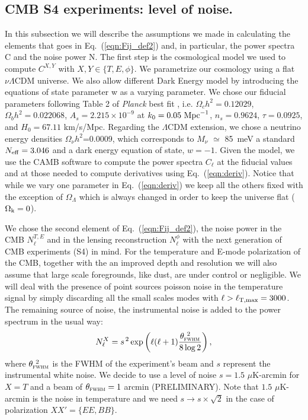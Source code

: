 \documentclass[aps,prd,preprint,groupedaddress]{revtex4-1}
\newcommand\refeq[1]{Eq.~(\ref{eqn:#1})}
\begin{document}
\subsection{CMB S4 experiments: level of noise.\label{subsec:cosmo-noise}}
In this subsection we will describe the assumptions we made in calculating the elements that goes in \refeq{Fij_def2} and, in particular, the power spectra C and the noise power N.
The first step is the cosmological model we used to compute $C^{X,Y}$ with $X,Y \in \{T,E,\phi\}$.
We parametrize our cosmology using a flat $\nu \Lambda$CDM universe. We also allow different Dark Energy model by introducing the equations of state parameter w as a varying parameter.
We chose our fiducial parameters following Table 2 of \textit{Planck} best fit \cite{planck-collaboration:2014g}, i.e. $\Omega_c h^2 = 0.12029$, $\Omega_b h^2 = 0.022068$, $A_s = 2.215\times10^{-9}$ at $k_0 = 0.05\ {\rm Mpc}^{-1}$, $n_s = 0.9624$, $\tau = 0.0925$, and $H_0 = 67.11$ km/s/Mpc. Regarding the $\Lambda$CDM extension, we chose a neutrino energy densities $\Omega_{\nu} h^2$=0.0009, which corresponds to $M_{\nu}$ $\simeq$ 85\ meV a standard $N_{\rm eff}=3.046$ and a dark energy equation of state, $w=-1$.
Given the model, we use the CAMB software to compute the power spectra $C_{\ell}$ at the fiducial values and at those needed to compute derivatives using \refeq{deriv}. Notice that while we vary one parameter in \refeq{deriv} we keep all the others fixed with the exception of $\Omega_{\Lambda}$ which is always changed in order to keep the universe flat ($\Omega_{\rm k} = 0$).

We chose the second element of \refeq{Fij_def2}, the noise power in the CMB $N_{\ell}^{T,E}$ and in the lensing reconstruction $N_{\ell}^{\phi}$ with the next generation of CMB experiments (S4) in mind.
For the temperature and E-mode polarization of the CMB, together with the an improved depth and resolution we will also assume that large scale foregrounds, like dust, are under control or negligible. We will deal with the presence of point sources poisson noise in the temperature signal by simply discarding all the small scales modes with $\ell>\ell_{\rm T,max}=3000$.
The remaining source of noise, the instrumental noise is added to the power spectrum in the usual way:
 \begin{equation}
 	\centering
		N^{X}_\ell = s^{\, 2} \exp \left(\ell(\ell+1) \frac{\theta^{\ 2}_{\textsc{fwhm}}}{8\log2}\right),
	\label{eq:beamnoise}
\end{equation}
where $\theta^{\ 2}_{\textsc{fwhm}}$ is the FWHM of the experiment's beam and $s$ represent the instrumental white noise.
We decide to use a level of noise $s = 1.5$ $\mu$K-arcmin for $X=T$ and a beam of $\theta_{\textsc{fwhm}}=1$ arcmin (PRELIMINARY).
Note that $1.5$ $\mu$K-arcmin is the noise in temperature and we need $s \rightarrow s\times \sqrt{2}$ in the case of polarization $ XX' = \{ EE, BB \}$.
\end{document}
